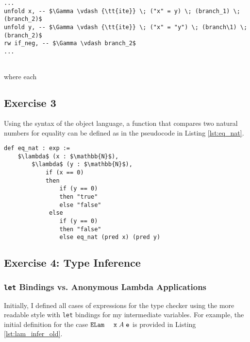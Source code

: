 \documentclass{article}
\newcommand{\tt}[1]{\texttt{#1}}
\begin{document}
\begin{minipage}{\textwidth}
\begin{lstlisting}[mathescape = true, caption={Unfolding to string literals.}, captionpos=b, label={lst:ite_unfold}]
...
unfold x, -- $\Gamma \vdash {\tt{ite}} \; ("x" = y) \; (branch_1) \; (branch_2)$
unfold y, -- $\Gamma \vdash {\tt{ite}} \; ("x" = "y") \; (branch\1) \; (branch_2)$
rw if_neg, -- $\Gamma \vdash branch_2$
...
\end{lstlisting}
\end{minipage} \\

where each 

\subsection{Exercise 3}
Using the syntax of the object language, a function that compares two natural numbers for equality can be defined as in the pseudocode in Listing \ref{lst:eq_nat}. \\

\begin{minipage}{\textwidth}
\begin{lstlisting}[mathescape = true, caption={Function for comparing natural numbers for equality.}, captionpos=b, label={lst:eq_nat}]
def eq_nat : exp :=
    $\lambda$ (x : $\mathbb{N}$),
        $\lambda$ (y : $\mathbb{N}$),
            if (x == 0)
            then
                if (y == 0)
                then "true"
                else "false"
             else
                if (y == 0)
                then "false"
                else eq_nat (pred x) (pred y)
\end{lstlisting}
\end{minipage}

\subsection{Exercise 4: Type Inference}


\subsubsection{{\tt{let}} Bindings vs. Anonymous Lambda Applications}

Initially, I defined all cases of expressions for the type checker using the more readable style with {\tt{let}} bindings for my intermediate variables. For example, the initial definition for the case ${\tt{ELam \; x}} \; A \; {\tt{e}}$ is provided in Listing \ref{lst:lam_infer_old}.\\
\end{document}
